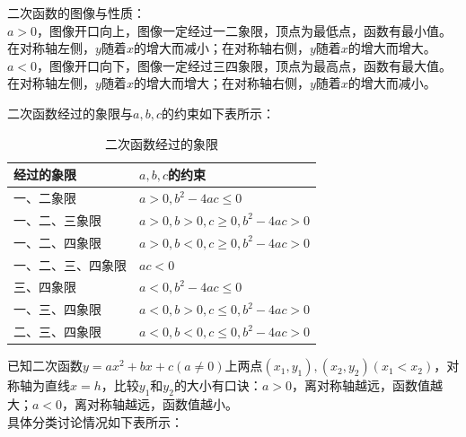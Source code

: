 \begin{theorem}
    二次函数的图像与性质：\\
    $a>0$，图像开口向上，图像一定经过一二象限，顶点为最低点，函数有最小值。在对称轴左侧，$y$随着$x$的增大而减小；在对称轴右侧，$y$随着$x$的增大而增大。\\
    $a<0$，图像开口向下，图像一定经过三四象限，顶点为最高点，函数有最大值。在对称轴左侧，$y$随着$x$的增大而增大；在对称轴右侧，$y$随着$x$的增大而减小。
\end{theorem}
\begin{theorem}
    二次函数经过的象限与$a,b,c$的约束如下表所示：
\end{theorem}
\begin{table}[H]
    \centering
    \caption{二次函数经过的象限}
    \begin{tabular}{l|l}
        \hline
        \hline
        经过的象限     & $a,b,c$的约束                  \\
        \hline
        一、二象限     & $a>0,b^2-4ac \le 0$         \\
        一、二、三象限   & $a>0,b>0,c\ge 0,b^2-4ac>0$  \\
        一、二、四象限   & $a>0,b<0,c\ge 0,b^2-4ac>0$  \\
        一、二、三、四象限 & $ac<0$                      \\
        三、四象限     & $a<0,b^2-4ac \le 0$         \\
        一、三、四象限   & $a<0,b>0,c \le 0,b^2-4ac>0$ \\
        二、三、四象限   & $a<0,b<0,c \le 0,b^2-4ac>0$ \\
        \hline
        \hline
    \end{tabular}
\end{table}
\begin{theorem}
    已知二次函数$y=ax^2+bx+c(a\ne 0)$上两点$(x_1,y_1),(x_2,y_2)(x_1 < x_2)$，对称轴为直线$x=h$，比较$y_1$和$y_2$的大小有口诀：$a>0$，离对称轴越远，函数值越大；$a<0$，离对称轴越远，函数值越小。\\
    具体分类讨论情况如下表所示：
\end{theorem}
